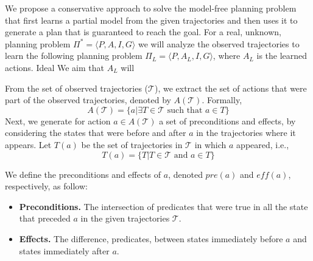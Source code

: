 \documentclass[letterpaper]{article}
\begin{document}




We propose a conservative approach to solve the model-free planning problem
that first learns a partial model from the given trajectories and then uses it to generate a plan that is guaranteed to reach the goal. For a real, unknown, planning problem $\Pi^*=\langle P,A,I,G\rangle$ we will analyze the observed trajectories to learn the following planning problem $\Pi_L=\langle P,A_L,I,G\rangle$, where $A_L$ is the learned actions. 
Ideal
We aim that $A_L$ will 


From the set of observed trajectories ($\mathcal{T}$), we extract the set of actions that were part of the observed trajectories, denoted by $A(\mathcal{T})$. Formally,
\[ A(\mathcal{T})=\{a | \exists T\in\mathcal{T} \text{~such that~} a\in T\} \]
Next, we generate for action $a\in A(\mathcal{T})$ a set of preconditions and effects, by considering the states that were before and after $a$ in the trajectories where it appears. 
Let $T(a)$ be the set of trajectories in $\mathcal{T}$ in which $a$ appeared, i.e., 
\[ T(a)=\{T | T\in \mathcal{T} \text{~and~} a\in T\} \]


We define the preconditions and effects of $a$, denoted $pre(a)$ and $eff(a)$, respectively, as follow:
\begin{itemize}
    \item {\bf Preconditions.} The intersection of predicates that were true in all the state that preceded $a$ in the given trajectories $\mathcal{T}$. 
    \item {\bf Effects.} The difference, predicates, between states immediately before $a$ and states immediately after $a$. 
\end{itemize}
\end{document}
